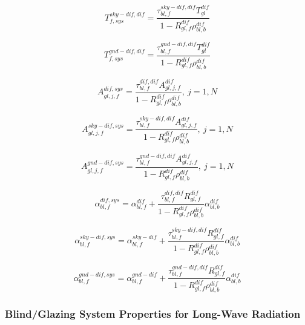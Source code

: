 \begin{equation}
T_{f,sys}^{sky - dif,dif} = \frac{{\tau_{bl,f}^{sky - dif,dif}T_{gl}^{dif}}}{{1 - R_{gl,f}^{dif}\rho_{bl,b}^{dif}}}
\end{equation}

\begin{equation}
T_{f,sys}^{gnd - dif,dif} = \frac{{\tau_{bl,f}^{gnd - dif,dif}T_{gl}^{dif}}}{{1 - R_{gl,f}^{dif}\rho_{bl,b}^{dif}}}
\end{equation}

\begin{equation}
A_{gl,j,f}^{dif,sys} = \frac{{\tau_{bl,f}^{dif,dif}A_{gl,j,f}^{dif}}}{{1 - R_{gl,f}^{dif}\rho_{bl,b}^{dif}}},{\mathrm{    }}~j = 1,N
\end{equation}

\begin{equation}
A_{gl,j,f}^{sky - dif,sys} = \frac{{\tau_{bl,f}^{sky - dif,dif}A_{gl,j,f}^{dif}}}{{1 - R_{gl,f}^{dif}\rho_{bl,b}^{dif}}},{\mathrm{    }}~j = 1,N
\end{equation}

\begin{equation}
A_{gl,j,f}^{gnd - dif,sys} = \frac{{\tau_{bl,f}^{gnd - dif,dif}A_{gl,j,f}^{dif}}}{{1 - R_{gl,f}^{dif}\rho_{bl,b}^{dif}}},{\mathrm{    }}~j = 1,N
\end{equation}

\begin{equation}
\alpha_{bl,f}^{dif,sys} = \alpha_{bl,f}^{dif} + \frac{{\tau_{bl,f}^{dif,dif}R_{gl,f}^{dif}}}{{1 - R_{gl,f}^{dif}\rho_{bl,b}^{dif}}}\alpha_{bl,b}^{dif}
\end{equation}

\begin{equation}
\alpha_{bl,f}^{sky - dif,sys} = \alpha_{bl,f}^{sky - dif} + \frac{{\tau_{bl,f}^{sky - dif,dif}R_{gl,f}^{dif}}}{{1 - R_{gl,f}^{dif}\rho_{bl,b}^{dif}}}\alpha_{bl,b}^{dif}
\end{equation}

\begin{equation}
\alpha_{bl,f}^{gnd - dif,sys} = \alpha_{bl,f}^{gnd - dif} + \frac{{\tau_{bl,f}^{gnd - dif,dif}R_{gl,f}^{dif}}}{{1 - R_{gl,f}^{dif}\rho_{bl,b}^{dif}}}\alpha_{bl,b}^{dif}
\end{equation}

\subsubsection{Blind/Glazing System Properties for Long-Wave Radiation}\label{blindglazing-system-properties-for-long-wave-radiation}

